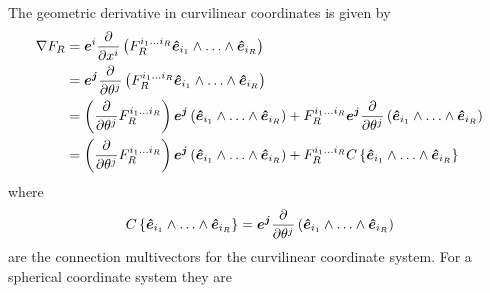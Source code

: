 \documentclass[letterpaper,10pt,english]{sphinxmanual}
\begin{document}
The geometric derivative in curvilinear coordinates is given by
\begin{align*}
  \nabla F_{R} & =  \bm{e}^{i}\pdiff{}{x^{i}}\lp F_{R}^{i_{1}\dots i_{R}}
                   \bm{\hat{e}}_{i_{1}}\W\dots\W\bm{\hat{e}}_{i_{R}}\rp  \\
                 & =  \bm{e^{j}}\pdiff{}{\theta^{j}}\lp F_{R}^{i_{1}\dots i_{R}}
                   \bm{\hat{e}}_{i_{1}}\W\dots\W\bm{\hat{e}}_{i_{R}}\rp  \\
                 & =   \lp\pdiff{}{\theta^{j}} F_{R}^{i_{1}\dots i_{R}}\rp
                   \bm{e^{j}}\lp\bm{\hat{e}}_{i_{1}}\W\dots\W\bm{\hat{e}}_{i_{R}}\rp+
                   F_{R}^{i_{1}\dots i_{R}}\bm{e^{j}}
                   \pdiff{}{\theta^{j}}\lp\bm{\hat{e}}_{i_{1}}\W\dots\W\bm{\hat{e}}_{i_{R}}\rp \\
                 & =   \lp\pdiff{}{\theta^{j}} F_{R}^{i_{1}\dots i_{R}}\rp
                   \bm{e^{j}}\lp\bm{\hat{e}}_{i_{1}}\W\dots\W\bm{\hat{e}}_{i_{R}}\rp+
                   F_{R}^{i_{1}\dots i_{R}}C\lbrc \bm{\hat{e}}_{i_{1}}\W\dots\W\bm{\hat{e}}_{i_{R}}\rbrc
\end{align*}
where
\begin{equation*}
C\lbrc \bm{\hat{e}}_{i_{1}}\W\dots\W\bm{\hat{e}}_{i_{R}}\rbrc  = \bm{e^{j}}\pdiff{}{\theta^{j}}
                                                            \lp\bm{\hat{e}}_{i_{1}}\W\dots\W\bm{\hat{e}}_{i_{R}}\rp
\end{equation*}
are the connection multivectors for the curvilinear coordinate system. For a
spherical coordinate system they are
\end{document}
